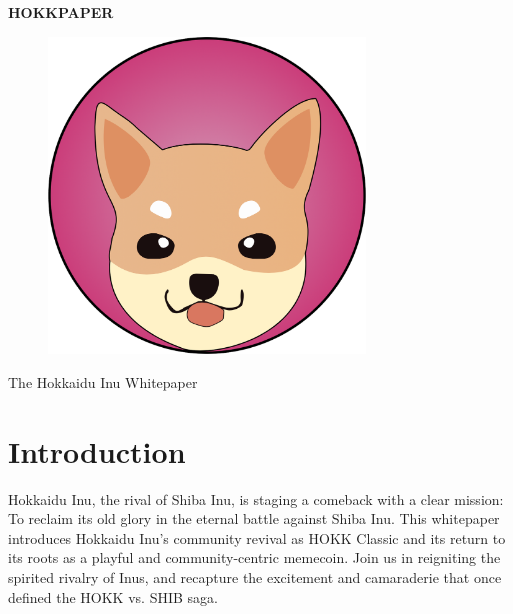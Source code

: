 \documentclass{article}
\begin{document}
\pagestyle{fancy}
\thispagestyle{empty}
\fancyhead{} %
\fancyfoot{} %

\begin{center}
  \huge
  \colorbox{pink1}{\textbf{HOKKPAPER}}
\end{center}

\vspace{30mm}

\begin{figure}[h]
  \centering
  \includegraphics[width=0.75\textwidth]{big-logo}
\end{figure}

\vspace{30mm}
\begin{center}
  \large
  The Hokkaidu Inu Whitepaper
\end{center}

\clearpage

\xpretocmd\headrule{\color{pink1}}{}{\PatchFailed}
\renewcommand{\headrulewidth}{1pt}
\fancyfoot[R]{\thepage}

\setcounter{page}{1}

\section{Introduction}
Hokkaidu Inu, the rival of Shiba Inu, is staging a comeback with a clear mission: To reclaim its old glory in the eternal battle against Shiba Inu. This whitepaper introduces Hokkaidu Inu's community revival as HOKK Classic and its return to its roots as a playful and community-centric memecoin. Join us in reigniting the spirited rivalry of Inus, and recapture the excitement and camaraderie that once defined the HOKK vs. SHIB saga.
\end{document}
